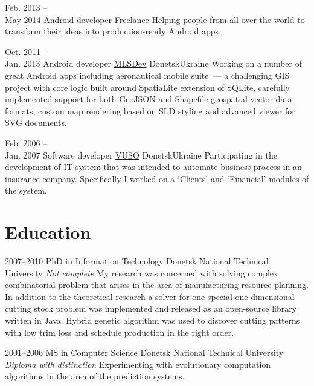 \cventry
    {Feb. 2013 --\\May 2014}
    {Android developer}
    {Freelance}
    {}{}
    {Helping people from all over the world to transform their ideas into 
    production-ready Android apps.\newline}

\cventry
    {Oct. 2011 --\\Jan. 2013}
    {Android developer}
    {\href{http://mlsdev.com/}{MLSDev}}
    {Donetsk}{Ukraine}
    {Working on a number of great Android apps including aeronautical mobile 
    suite~--- a challenging GIS project with core logic built around SpatiaLite 
    extension of SQLite, carefully implemented support for both GeoJSON and 
    Shapefile geospatial vector data formats, custom map rendering based on SLD 
    styling and advanced viewer for SVG documents.\newline}

\cventry
    {Feb. 2006 --\\Jan. 2007}
    {Software developer}
    {\href{http://vuso.ua/}{VUSO}}
    {Donetsk}{Ukraine}
    {Participating in the development of IT system that was intended to 
    automate business process in an insurance company. Specifically I worked on 
    a `Clients' and `Financial' modules of the system.}


\medskip
\section{Education}

\cventry
    {2007--2010}
    {PhD in Information Technology}
    {Donetsk National Technical University}
    {}
    {\newline\textit{Not complete}}
    {My research was concerned with solving complex combinatorial problem that
    arises in the area of manufacturing resource planning. In addition to the
    theoretical research a solver for one special one-dimensional cutting stock
    problem was implemented and released as an open-source library written in
    Java. Hybrid genetic algorithm was used to discover cutting patterns with
    low trim loss and schedule production in the right order.\newline}
    
\cventry
    {2001--2006}
    {MS in Computer Science}
    {Donetsk National Technical University}
    {}
    {\newline\textit{Diploma with distinction}}
    {Experimenting with evolutionary computation algorithms in the area of the
    prediction systems.}


